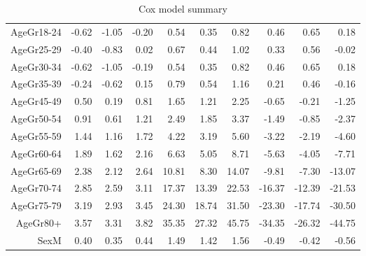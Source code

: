 \begin{table}[ht]
\begin{tabular}{rrrrrrrrrr}
  AgeGr18-24 & -0.62 & -1.05 & -0.20 & 0.54 & 0.35 & 0.82 & 0.46 & 0.65 & 0.18 \\ 
  AgeGr25-29 & -0.40 & -0.83 & 0.02 & 0.67 & 0.44 & 1.02 & 0.33 & 0.56 & -0.02 \\ 
  AgeGr30-34 & -0.62 & -1.05 & -0.19 & 0.54 & 0.35 & 0.82 & 0.46 & 0.65 & 0.18 \\ 
  AgeGr35-39 & -0.24 & -0.62 & 0.15 & 0.79 & 0.54 & 1.16 & 0.21 & 0.46 & -0.16 \\ 
  AgeGr45-49 & 0.50 & 0.19 & 0.81 & 1.65 & 1.21 & 2.25 & -0.65 & -0.21 & -1.25 \\ 
  AgeGr50-54 & 0.91 & 0.61 & 1.21 & 2.49 & 1.85 & 3.37 & -1.49 & -0.85 & -2.37 \\ 
  AgeGr55-59 & 1.44 & 1.16 & 1.72 & 4.22 & 3.19 & 5.60 & -3.22 & -2.19 & -4.60 \\ 
  AgeGr60-64 & 1.89 & 1.62 & 2.16 & 6.63 & 5.05 & 8.71 & -5.63 & -4.05 & -7.71 \\ 
  AgeGr65-69 & 2.38 & 2.12 & 2.64 & 10.81 & 8.30 & 14.07 & -9.81 & -7.30 & -13.07 \\ 
  AgeGr70-74 & 2.85 & 2.59 & 3.11 & 17.37 & 13.39 & 22.53 & -16.37 & -12.39 & -21.53 \\ 
  AgeGr75-79 & 3.19 & 2.93 & 3.45 & 24.30 & 18.74 & 31.50 & -23.30 & -17.74 & -30.50 \\ 
  AgeGr80+ & 3.57 & 3.31 & 3.82 & 35.35 & 27.32 & 45.75 & -34.35 & -26.32 & -44.75 \\ 
  SexM & 0.40 & 0.35 & 0.44 & 1.49 & 1.42 & 1.56 & -0.49 & -0.42 & -0.56 \\ 
   \hline
\end{tabular}
\caption{Cox model summary} 
\end{table}
